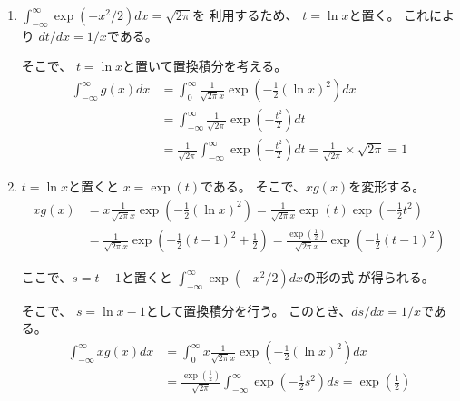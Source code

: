 \documentclass[12pt,b5paper]{ltjsarticle}
\begin{document}
\begin{description}
\begin{enumerate}
             \dotfill

             \begin{enumerate}
              \item
                   $\int_{-\infty}^{\infty} \exp{(-x^{2}/2)}dx = \sqrt{2\pi}$を
                   利用するため、
                   $t=\ln{x}$と置く。
                   これにより
                   $dt/dx=1/x$である。

                   そこで、
                   $t= \ln{x}$と置いて置換積分を考える。
                   \begin{align}
                    \int_{-\infty}^{\infty} g(x) dx
                    &=
                    \int_{0}^{\infty} \frac{1}{\sqrt{2\pi}x}\exp{\left(-\frac{1}{2}(\ln{x})^{2}\right)} dx\\
                    &=
                    \int_{-\infty}^{\infty} \frac{1}{\sqrt{2\pi}}\exp{\left(-\frac{t^{2}}{2}\right)} dt\\
                    &= \frac{1}{\sqrt{2\pi}} \int_{-\infty}^{\infty}\exp{\left(-\frac{t^{2}}{2}\right)} dt
                    = \frac{1}{\sqrt{2\pi}} \times \sqrt{2\pi}
                    =1
                   \end{align}


              \item
                   $t=\ln{x}$と置くと
                   $x=\exp{(t)}$である。
                   そこで、$xg(x)$を変形する。
                   \begin{align}
                    xg(x)
                    &= x \frac{1}{\sqrt{2\pi}x}\exp{\left(-\frac{1}{2}(\ln{x})^{2}\right)}
                    = \frac{1}{\sqrt{2\pi}x}\exp{(t)}\exp{\left(-\frac{1}{2}t^{2}\right)}\\
                    &= \frac{1}{\sqrt{2\pi}x}\exp{\left(-\frac{1}{2}(t-1)^{2}+\frac{1}{2}\right)}
                    = \frac{\exp{(\frac{1}{2})}}{\sqrt{2\pi}x}\exp{\left(-\frac{1}{2}(t-1)^{2}\right)}
                   \end{align}

                   ここで、$s=t-1$と置くと
                   $\int_{-\infty}^{\infty} \exp{(-x^{2}/2)}dx$の形の式
                   が得られる。

                   そこで、
                   $s=\ln{x}-1$として置換積分を行う。
                   このとき、$ds/dx=1/x$である。
                   \begin{align}
                    \int_{-\infty}^{\infty} xg(x) dx
                    &=
                    \int_{0}^{\infty} x \frac{1}{\sqrt{2\pi}x}\exp{\left(-\frac{1}{2}(\ln{x})^{2}\right)} dx\\
                    &= \frac{\exp{(\frac{1}{2})}}{\sqrt{2\pi}} \int_{-\infty}^{\infty} \exp{\left(-\frac{1}{2}s^{2}\right)} ds
                    = \exp{\left(\frac{1}{2}\right)}
                   \end{align}



\end{enumerate}
\end{enumerate}
\end{description}
\end{document}
